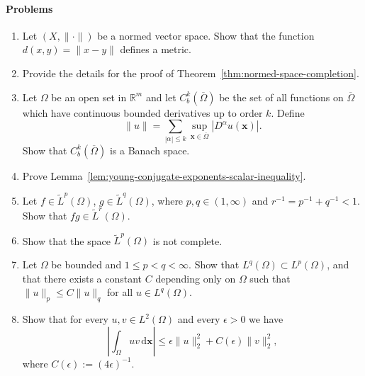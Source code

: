 \paragraph*{Problems}

\begin{enumerate}[label=\thesection.\arabic*.,ref=\thesection.\arabic*,start=1,series=book-problems]

\item\label{ex:norm-induced-metric} Let $(X,\|\cdot\|)$ be a normed vector space. Show that the function $d(x,y)=\|x-y\|$ defines a metric.

\item\label{ex:completion-theorem-proof-details} Provide the details for the proof of Theorem~\ref{thm:normed-space-completion}.

\item\label{ex:bounded-continuous-derivatives-banach} Let $\Omega$ be an open set in $\mathbb{R}^m$ and let $C_b^k(\overline\Omega)$ be the set of all functions on $\overline\Omega$ which have continuous bounded derivatives up to order $k$. Define
\begin{equation}\label{eq:bounded-continuous-derivatives-sum-norm}
\|u\|=\sum_{|\alpha|\leq k}\sup_{\bm{x}\in\overline\Omega}|D^\alpha u(\bm{x})|.
\end{equation}
Show that $C_b^k(\overline\Omega)$ is a Banach space.

\item\label{ex:young-conjugate-exponents-inequality} Prove Lemma~\ref{lem:young-conjugate-exponents-scalar-inequality}.

\item\label{ex:lp-product-conjugate-exponent-variant} Let $f\in\widetilde L^p(\Omega)$, $g\in\widetilde L^q(\Omega)$, where $p,q\in(1,\infty)$ and $r^{-1}=p^{-1}+q^{-1}<1$. Show that $fg\in\widetilde L^r(\Omega)$.

\item\label{ex:continuous-lp-not-complete} Show that the space $\widetilde L^p(\Omega)$ is not complete.

\item\label{ex:bounded-domain-lq-lp-inclusion} Let $\Omega$ be bounded and $1\leq p<q<\infty$. Show that $L^q(\Omega)\subset L^p(\Omega)$, and that there exists a constant $C$ depending only on $\Omega$ such that $\|u\|_p\leq C\|u\|_q$ for all $u\in L^q(\Omega)$.

\item\label{ex:lp-two-product-epsilon-bound} Show that for every $u,v\in L^2(\Omega)$ and every $\epsilon>0$ we have \[\left|\int_\Omega uv\,\mathrm{d}\bm{x}\right|\leq\epsilon\|u\|_2^2+C(\epsilon)\|v\|_2^2,\] where $C(\epsilon):=(4\epsilon)^{-1}$.


\end{enumerate}
